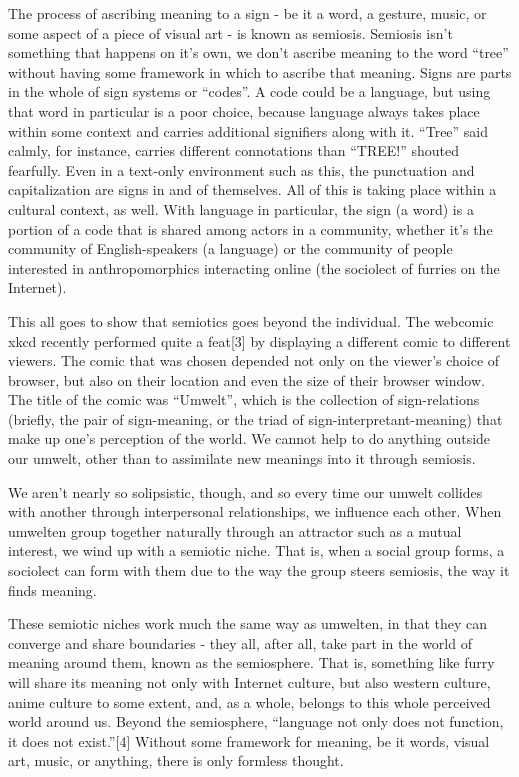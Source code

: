 The process of ascribing meaning to a sign - be it a word, a gesture, music, or some aspect of a piece of visual art - is known as semiosis. Semiosis isn't something that happens on it's own, we don't ascribe meaning to the word ``tree'' without having some framework in which to ascribe that meaning. Signs are parts in the whole of sign systems or ``codes''. A code could be a language, but using that word in particular is a poor choice, because language always takes place within some context and carries additional signifiers along with it. ``Tree'' said calmly, for instance, carries different connotations than ``TREE!'' shouted fearfully. Even in a text-only environment such as this, the punctuation and capitalization are signs in and of themselves. All of this is taking place within a cultural context, as well. With language in particular, the sign (a word) is a portion of a code that is shared among actors in a community, whether it's the community of English-speakers (a language) or the community of people interested in anthropomorphics interacting online (the sociolect of furries on the Internet).

This all goes to show that semiotics goes beyond the individual. The webcomic xkcd recently performed quite a feat{[}3{]} by displaying a different comic to different viewers. The comic that was chosen depended not only on the viewer's choice of browser, but also on their location and even the size of their browser window. The title of the comic was ``Umwelt'', which is the collection of sign-relations (briefly, the pair of sign-meaning, or the triad of sign-interpretant-meaning) that make up one's perception of the world. We cannot help to do anything outside our umwelt, other than to assimilate new meanings into it through semiosis.

We aren't nearly so solipsistic, though, and so every time our umwelt collides with another through interpersonal relationships, we influence each other. When umwelten group together naturally through an attractor such as a mutual interest, we wind up with a semiotic niche. That is, when a social group forms, a sociolect can form with them due to the way the group steers semiosis, the way it finds meaning.

These semiotic niches work much the same way as umwelten, in that they can converge and share boundaries - they all, after all, take part in the world of meaning around them, known as the semiosphere. That is, something like furry will share its meaning not only with Internet culture, but also western culture, anime culture to some extent, and, as a whole, belongs to this whole perceived world around us. Beyond the semiosphere, ``language not only does not function, it does not exist.''{[}4{]} Without some framework for meaning, be it words, visual art, music, or anything, there is only formless thought.

